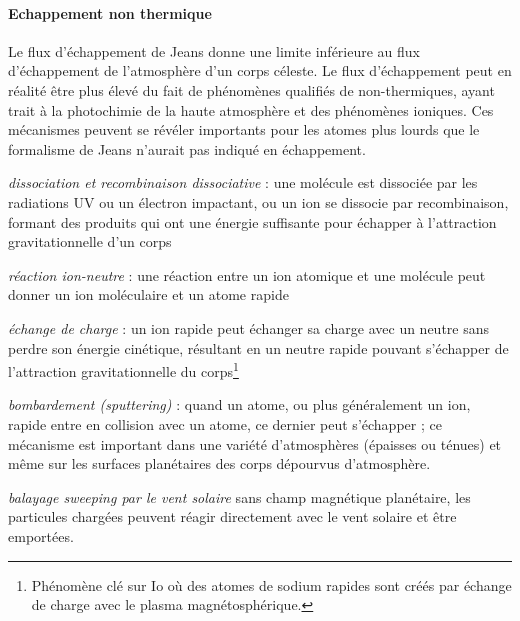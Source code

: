 \sk
\paragraph{Echappement non thermique} Le flux d'échappement de Jeans donne une limite inférieure au flux d'échappement de l'atmosphère d'un corps céleste. Le flux d'échappement peut en réalité être plus élevé du fait de phénomènes qualifiés de non-thermiques, ayant trait à la photochimie de la haute atmosphère et des phénomènes ioniques. Ces mécanismes peuvent se révéler importants pour les atomes plus lourds que le formalisme de Jeans n'aurait pas indiqué en échappement.
\begin{description}
\item{\emph{dissociation et recombinaison dissociative}} : une molécule est dissociée par les radiations UV ou un électron impactant, ou un ion se dissocie par recombinaison, formant des produits qui ont une énergie suffisante pour échapper à l'attraction gravitationnelle d'un corps
\item{\emph{réaction ion-neutre}} : une réaction entre un ion atomique et une molécule peut donner un ion moléculaire et un atome rapide
\item{\emph{échange de charge}} : un ion rapide peut échanger sa charge avec un neutre sans perdre son énergie cinétique, résultant en un neutre rapide pouvant s'échapper de l'attraction gravitationnelle du corps\footnote{Phénomène clé sur Io où des atomes de sodium rapides sont créés par échange de charge avec le plasma magnétosphérique.}
\item{\emph{bombardement (\emph{sputtering})}} : quand un atome, ou plus généralement un ion, rapide entre en collision avec un atome, ce dernier peut s'échapper ; ce mécanisme est important dans une variété d'atmosphères (épaisses ou ténues) et même sur les surfaces planétaires des corps dépourvus d'atmosphère.
\item{\emph{balayage \emph{sweeping} par le vent solaire}} sans champ magnétique planétaire, les particules chargées peuvent réagir directement avec le vent solaire et être emportées. %
\end{description}

\sk
